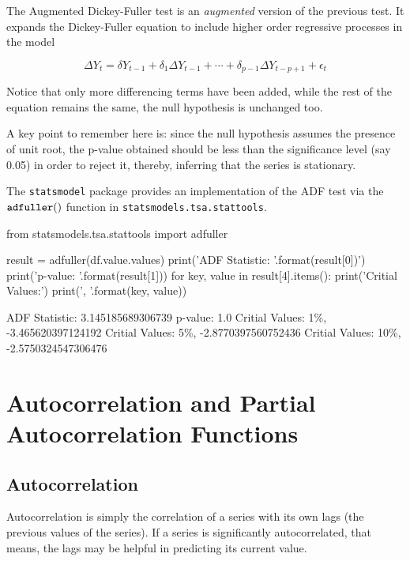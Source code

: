 The Augmented Dickey-Fuller test is an \emph{augmented} version of the previous test. It expands the Dickey-Fuller equation
to include higher order regressive processes in the model

\[\Delta Y_t = \delta Y_{t-1} + \delta_1 \Delta Y_{t-1} + \cdots + \delta_{p-1} \Delta Y_{t-p+1} + \epsilon_t\]

Notice that only more differencing terms have been added, while the rest of the equation remains the same, the null hypothesis is unchanged too.

A key point to remember here is: since the null hypothesis assumes the presence of unit root, the p-value obtained should be less than the significance level (say 0.05) in order to reject it, thereby, inferring that the series is stationary.

The \texttt{statsmodel} package provides an implementation of the ADF test via the \(\tt{adfuller()}\) function in \texttt{statsmodels.tsa.stattools}.

\begin{ipython}
from statsmodels.tsa.stattools import adfuller

result = adfuller(df.value.values)
print('ADF Statistic: {}'.format(result[0])')
print('p-value: {}'.format(result[1]))
for key, value in result[4].items():
    print('Critial Values:')
    print('{}, {}'.format(key, value))
\end{ipython}
\begin{ioutput}
ADF Statistic: 3.145185689306739
p-value: 1.0
Critial Values:
   1\%, -3.465620397124192
Critial Values:
   5\%, -2.8770397560752436
Critial Values:
   10\%, -2.5750324547306476
\end{ioutput}

\section{Autocorrelation and Partial Autocorrelation Functions}
\label{autocorrelation-and-partial-autocorrelation-functions}

\subsection{Autocorrelation}\label{autocorrelation}

Autocorrelation is simply the correlation of a series with its own lags (the previous values of the series). If a series is significantly autocorrelated, that means, the lags may be helpful in predicting its current value.

